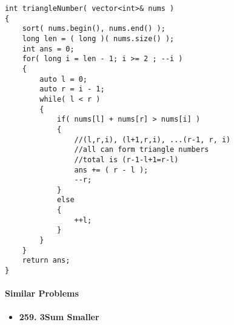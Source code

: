 \setcounter{lstlisting}{0}
\begin{lstlisting}[style=customc, caption={Two Pointers}]
int triangleNumber( vector<int>& nums )
{
    sort( nums.begin(), nums.end() );
    long len = ( long )( nums.size() );
    int ans = 0;
    for( long i = len - 1; i >= 2 ; --i )
    {
        auto l = 0;
        auto r = i - 1;
        while( l < r )
        {
            if( nums[l] + nums[r] > nums[i] )
            {
                //(l,r,i), (l+1,r,i), ...(r-1, r, i)
                //all can form triangle numbers
                //total is (r-1-l+1=r-l)
                ans += ( r - l );
                --r;
            }
            else
            {
                ++l;
            }
        }
    }
    return ans;
}
\end{lstlisting}

\paragraph{Similar Problems}
\begin{itemize}
\item \textbf{259. 3Sum Smaller}
\end{itemize}

